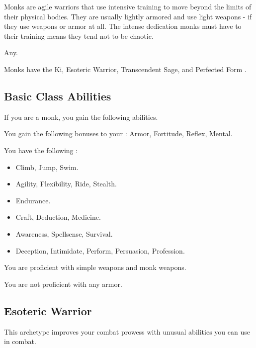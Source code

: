     Monks are agile warriors that use intensive training to move beyond the limits of their physical bodies.
    They are usually lightly armored and use light weapons - if they use weapons or armor at all.
    The intense dedication monks must have to their training means they tend not to be chaotic.

     Any.

     Monks have the Ki, Esoteric Warrior, Transcendent Sage, and Perfected Form .

    \subsection{Basic Class Abilities}
        If you are a monk, you gain the following abilities.

        You gain the following bonuses to your :  Armor,  Fortitude,  Reflex,  Mental.

        You have the following :
        \begin{itemize}
            \item {} Climb, Jump, Swim.
            \item {} Agility, Flexibility, Ride, Stealth.
            \item {} Endurance.
            \item {} Craft, Deduction, Medicine.
            \item {} Awareness, Spellsense, Survival.
            \item {} Deception, Intimidate, Perform, Persuasion, Profession.
        \end{itemize}

        You are proficient with simple weapons and monk weapons.

        You are not proficient with any armor.

    \newpage
    \subsection{Esoteric Warrior}\label{Esoteric Warrior}
        This archetype improves your combat prowess with unusual abilities you can use in combat.

